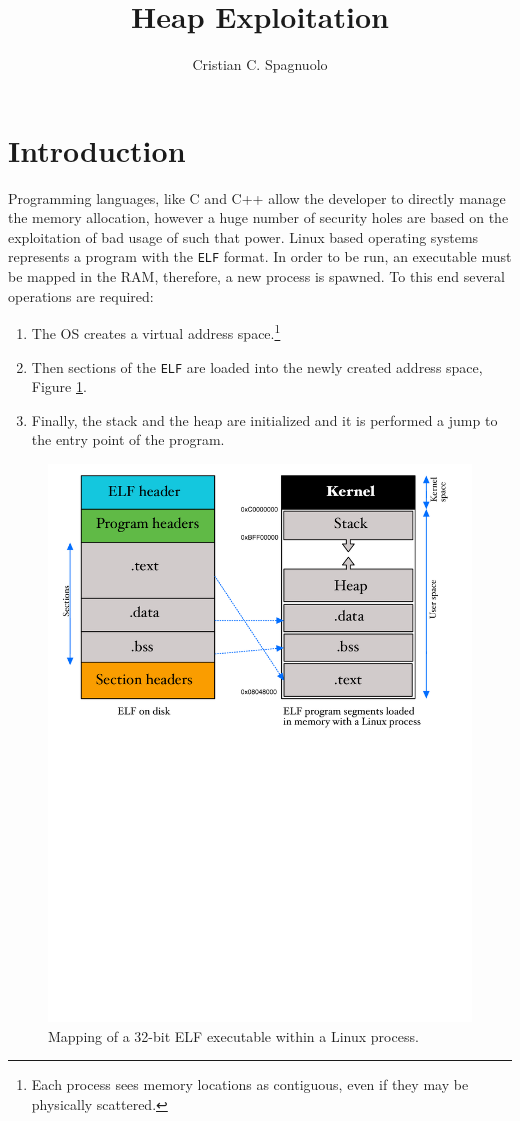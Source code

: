 \documentclass{article}
\title{{\huge Heap Exploitation}}
\author{Cristian C. Spagnuolo}
\numberwithin{equation}{subsection}
\begin{document}
\maketitle
\section{Introduction}
Programming languages, like C and C++ allow the developer to directly manage the memory allocation, however a huge number of security holes are based on the exploitation of bad usage of such that power. Linux based operating systems represents a program with the \texttt{ELF} format. In order to be run, an executable must be mapped in the RAM, therefore, a new process is spawned. To this end several operations are required:
\begin{enumerate}
    \item The OS creates a virtual address space.\footnote{Each process sees memory locations as contiguous, even if they may be physically scattered.}
    \item Then sections of the \texttt{ELF} are loaded into the newly created address space, Figure \ref{fig:elf_mapping}.
    \item Finally, the stack and the heap are initialized and it is performed a jump to the entry point of the program.
\end{enumerate}
\begin{figure}
    \centering
    \includegraphics[width=\textwidth]{elf_mapping.pdf}
    \caption{Mapping of a 32-bit ELF executable within a Linux process.}
    \label{fig:elf_mapping}
\end{figure}
\end{document}
